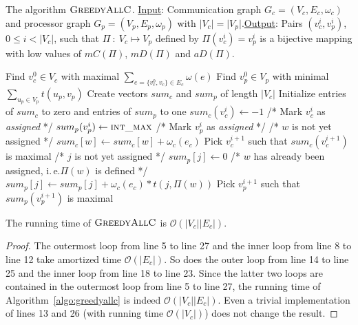 \documentclass[pdftex]{llncs}
\newcommand{\ie}{i.\,e.\xspace}
\newcommand{\bigO}{\mathcal{O}}
\newcommand{\greedyallc}{\textsc{GreedyAllC}\xspace}
\newcommand{\intmax}{\textsc{int\_max}\xspace}
\begin{document}
\begin{algorithm}[!h]
\caption{The algorithm $\greedyallc$. \newline \underline{Input}:
  Communication graph $G_c=(V_c, E_c, \omega_c)$ and processor graph
  $G_p=(V_p, E_p, \omega_p)$ with $\vert V_c \vert = \vert V_p
  \vert$.\newline \underline{Output}: Pairs $(v^{i}_c, v^{i}_p)$, $0 \leq i <
  \vert V_c \vert$, such that $\Pi~:~V_c \mapsto V_p$ defined by
  $\Pi(v^{i}_c) = v^{i}_p$ is a bijective mapping with low values of
  $mC(\Pi)$, $mD(\Pi)$ and $aD(\Pi)$.}

\label{algo:greedyallc}
\begin{algorithmic}[1]
\State Find $v^0_c \in V_c$ with maximal $\sum_{e = \{v^0_c, v_c\} \in E_c} \omega(e)$
\State Find $v^0_p \in V_p$ with minimal $\sum_{u_p \in V_p} t(u_p, v_p)$
\State Create vectors $sum_c$ and $sum_p$ of length $\vert V_c \vert$
\State Initialize entries of $sum_c$ to zero and entries of  $sum_p$ to one
\State $sum_c(v^i_c) \gets -1$ /* Mark $v^i_c$ as \emph{assigned} */
\State $sum_p(v^i_p) \gets \intmax$  /* Mark $v^i_p$ as \emph{assigned} */
 /* $w$ is not yet assigned */
\State $sum_c[w] \gets sum_c[w] + \omega_c(e_c)$
\EndIf
\EndFor
\State Pick $v^{i+1}_c$ such that $sum_c(v^{i+1}_c)$ is maximal
\If{$sum_p[j] < \intmax$}
\State /* $j$ is not yet assigned */
\State $sum_p[j] \gets 0$
\State /* $w$ has already been assigned, \ie $\Pi(w)$ is defined */
\State $sum_p[j] \gets sum_p[j] + \omega_c(e_c) * t(j, \Pi(w))$
\EndIf
\EndFor
\EndIf
\EndFor
\State Pick $v^{i+1}_p$ such that $sum_p(v^{i+1}_p)$ is maximal
\EndFor
\end{algorithmic}
\end{algorithm}

\begin{proposition}
 The running time of $\greedyallc$ is $\bigO(\vert V_c \vert \vert E_c \vert)$.
\label{prop:time}
\end{proposition}

\begin{proof}
The outermost loop from line 5 to line 27 and the inner loop from line
8 to line 12 take amortized time $\bigO(\vert E_c \vert)$. So does the
outer loop from line 14 to line 25 and the inner loop from
line 18 to line 23. Since the latter two loops are contained in the
outermost loop from line 5 to line 27, the running time of
Algorithm~\ref{algo:greedyallc} is indeed $\bigO(\vert V_c \vert \vert
E_c \vert)$. Even a trivial implementation of lines 13 and 26 (with
running time $\bigO(\vert V_c \vert)$) does not change the result.
\end{proof}
\end{document}
